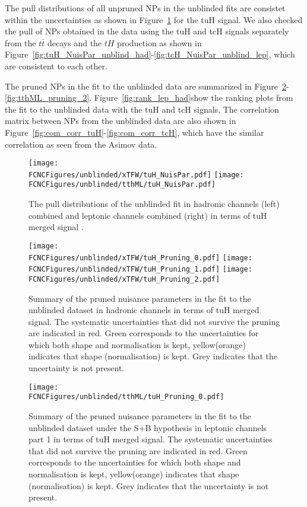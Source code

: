 The pull distributions of all unpruned NPs in the unblinded fits are consistet within the uncertainties as shown in Figure~\ref{fig:fcnc_pull_data}
for the tuH signal.
We also checked the pull of NPs obtained in the data using the tuH and tcH signals separately from the $t\bar t$ decays and the $tH$ production as shown
in Figure~\ref{fig:tuH_NuisPar_unblind_had}-\ref{fig:tcH_NuisPar_unblind_lep}, which are consistent to each other.

The pruned NPs in the fit to the unblinded data are summarized in Figure~\ref{fig:xTFW_pruning_0}-\ref{fig:tthML_pruning_2}.
Figure~\ref{fig:rank_lep_had}show the ranking plots from the fit to the unblinded data with the tuH and tcH signals.
The correlation matrix between NPs from the unblinded data are also shown in Figure~\ref{fig:com_corr_tuH}-\ref{fig:com_corr_tcH}, which have the similar correlation as seen from the Asimov data. 





\begin{figure}[htb]
\centering
\texttt{[image: \\FCNCFigures/unblinded/xTFW/tuH\_NuisPar.pdf]}
\texttt{[image: \\FCNCFigures/unblinded/tthML/tuH\_NuisPar.pdf]}
\caption{ The pull distributions of the unblinded fit in hadronic channels (left) combined and leptonic channels combined (right) in terms of tuH merged signal . }
\label{fig:fcnc_pull_data}
\end{figure}


\begin{figure}[htb]
\centering
\texttt{[image: \\FCNCFigures/unblinded/xTFW/tuH\_Pruning\_0.pdf]}
\texttt{[image: \\FCNCFigures/unblinded/xTFW/tuH\_Pruning\_1.pdf]}
\texttt{[image: \\FCNCFigures/unblinded/xTFW/tuH\_Pruning\_2.pdf]}
\caption{ Summary of the pruned nuisance parameters in the fit to the unblinded dataset in hadronic channels in terms of tuH merged signal. The systematic uncertainties that did not survive the pruning are indicated in red. Green corresponds to the uncertainties for which both shape and normalisation is kept, yellow(orange) indicates that shape (normalisation) is kept. Grey indicates that the uncertainty is not present.}
\label{fig:xTFW_pruning_0}
\end{figure}


\begin{figure}[htb]
\centering
\texttt{[image: \\FCNCFigures/unblinded/tthML/tuH\_Pruning\_0.pdf]}
\caption{ Summary of the pruned nuisance parameters in the fit to the unblinded dataset under the S+B hypothesis in leptonic channels part 1 in terms of tuH merged signal. The systematic uncertainties that did not survive the pruning are indicated in red. Green corresponds to the uncertainties for which both shape and normalisation is kept, yellow(orange) indicates that shape (normalisation) is kept. Grey indicates that the uncertainty is not present.}
\label{fig:tthML_pruning_0}
\end{figure}


